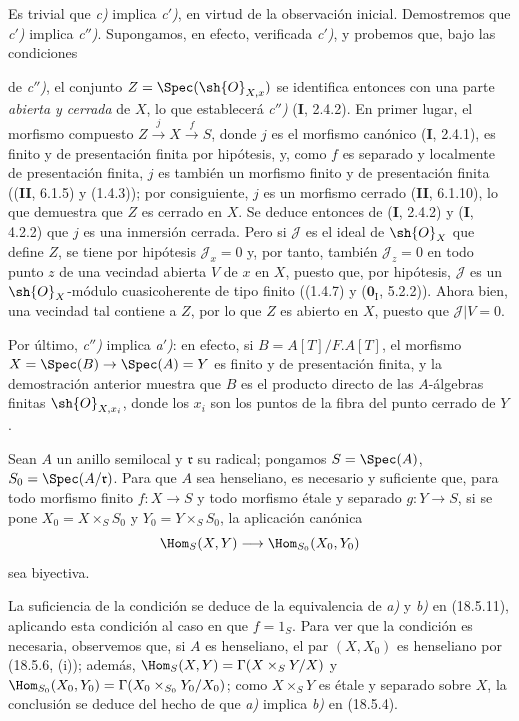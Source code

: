 Es trivial que \emph{c)} implica \emph{c$'$)}, en virtud de la observación inicial. Demostremos que \emph{c$'$)} implica \emph{c$''$)}. Supongamos, en efecto, verificada \emph{c$'$)}, y probemos que, bajo las condiciones


de \emph{c$''$)}, el conjunto $Z=\Spec(\sh{O}_{X,x})$ se identifica entonces con una parte \emph{abierta y cerrada} de $X$, lo que establecerá \emph{c$''$)} (\textbf I, 2.4.2). En primer lugar, el morfismo compuesto $Z\xrightarrow{j}X\xrightarrow{f}S$, donde $j$ es el morfismo canónico (\textbf I, 2.4.1), es finito y de presentación finita por hipótesis, y, como $f$ es separado y localmente de presentación finita, $j$ es también un morfismo finito y de presentación finita ((\textbf{II}, 6.1.5) y (1.4.3)); por consiguiente, $j$ es un morfismo cerrado (\textbf{II}, 6.1.10), lo que demuestra que $Z$ es cerrado en $X$. Se deduce entonces de (\textbf I, 2.4.2) y (\textbf I, 4.2.2) que $j$ es una inmersión cerrada. Pero si $\mathscr J$ es el ideal de $\sh{O}_X$ que define $Z$, se tiene por hipótesis $\mathscr J_x=0$ y, por tanto, también $\mathscr J_z=0$ en todo punto $z$ de una vecindad abierta $V$ de $x$ en $X$, puesto que, por hipótesis, $\mathscr J$ es un $\sh{O}_X$-módulo cuasicoherente de tipo finito ((1.4.7) y ($\mathbf{0}_{\mathrm I}$, 5.2.2)). Ahora bien, una vecindad tal contiene a $Z$, por lo que $Z$ es abierto en $X$, puesto que $\mathscr J|V=0$.

Por último, \emph{c$''$)} implica \emph{a$'$)}: en efecto, si $B=A[T]/F.A[T]$, el morfismo $X=\Spec(B)\to\Spec(A)=Y$ es finito y de presentación finita, y la demostración anterior muestra que $B$ es el producto directo de las $A$-álgebras finitas $\sh{O}_{X,x_i}$, donde los $x_i$ son los puntos de la fibra del punto cerrado de $Y$.

\begin{corollary}[18.5.12]
\label{IV.18.5.12}
Sean $A$ un anillo semilocal y $\mathfrak r$ su radical; pongamos $S=\Spec(A)$, $S_0=\Spec(A/\mathfrak r)$. Para que $A$ sea henseliano, es necesario y suficiente que, para todo morfismo \textup{finito} $f:X\to S$ y todo morfismo \textup{étale y separado} $g:Y\to S$, si se pone $X_0=X\times_S S_0$ \textup{y} $Y_0=Y\times_S S_0$, la aplicación canónica
\[
  \Hom_S(X,Y)\longrightarrow\Hom_{S_0}(X_0,Y_0)
\]
sea biyectiva.
\end{corollary}

La suficiencia de la condición se deduce de la equivalencia de \emph{a)} y \emph{b)} en (18.5.11), aplicando esta condición al caso en que $f=1_S$. Para ver que la condición es necesaria, observemos que, si $A$ es henseliano, el par $(X,X_0)$ es henseliano por (18.5.6, (i)); además, $\Hom_S(X,Y)=\Gamma(X\times_S Y/X)$ y $\Hom_{S_0}(X_0,Y_0)=\Gamma(X_0\times_{S_0}Y_0/X_0)$; como $X\times_S Y$ es étale y separado sobre $X$, la conclusión se deduce del hecho de que \emph{a)} implica \emph{b)} en (18.5.4).

